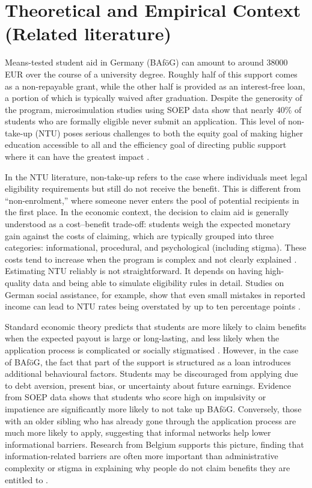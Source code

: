 \section{Theoretical and Empirical Context (Related literature)}
\label{section:theoretical_empirical_context}

Means-tested student aid in Germany (BAföG) can amount to around 38000 EUR over the course of a university degree. Roughly half of this support comes as a non-repayable grant, while the other half is provided as an interest-free loan, a portion of which is typically waived after graduation. Despite the generosity of the program, microsimulation studies using SOEP data show that nearly 40\% of students who are formally eligible never submit an application. This level of non-take-up (NTU) poses serious challenges to both the equity goal of making higher education accessible to all and the efficiency goal of directing public support where it can have the greatest impact \citep{herber_non-take-up_2019}.

In the NTU literature, non-take-up refers to the case where individuals meet legal eligibility requirements but still do not receive the benefit. This is different from “non-enrolment,” where someone never enters the pool of potential recipients in the first place. In the economic context, the decision to claim aid is generally understood as a cost–benefit trade-off: students weigh the expected monetary gain against the costs of claiming, which are typically grouped into three categories: informational, procedural, and psychological (including stigma). These costs tend to increase when the program is complex and not clearly explained \citep{Booij_role_2012}. Estimating NTU reliably is not straightforward. It depends on having high-quality data and being able to simulate eligibility rules in detail. Studies on German social assistance, for example, show that even small mistakes in reported income can lead to NTU rates being overstated by up to ten percentage points \citep{frick_claim_2007}.

Standard economic theory predicts that students are more likely to claim benefits when the expected payout is large or long-lasting, and less likely when the application process is complicated or socially stigmatised \citep{booij_role_2012}. However, in the case of BAföG, the fact that part of the support is structured as a loan introduces additional behavioural factors. Students may be discouraged from applying due to debt aversion, present bias, or uncertainty about future earnings. Evidence from SOEP data shows that students who score high on impulsivity or impatience are significantly more likely to not take up BAföG. Conversely, those with an older sibling who has already gone through the application process are much more likely to apply, suggesting that informal networks help lower informational barriers. Research from Belgium supports this picture, finding that information-related barriers are often more important than administrative complexity or stigma in explaining why people do not claim benefits they are entitled to \citep{fidan_why_2021, herber_non-take-up_2019, bolland_information_nodate}.

